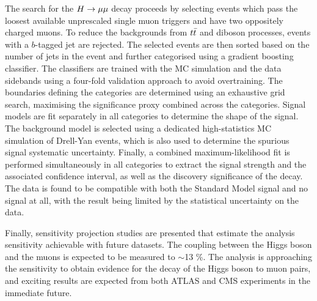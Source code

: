 The search for the $H \rightarrow \mu\mu$ decay proceeds by selecting
events which pass the loosest available unprescaled
single muon triggers and have two oppositely charged
muons. To reduce the backgrounds from $t\bar{t}$ and diboson
processes, events with a $b$-tagged jet are rejected.
The selected events are then sorted based on the number
of jets in the event and further categorised using a 
gradient boosting classifier. The classifiers are trained
with the MC simulation and the data sidebands using a four-fold
validation approach to avoid overtraining. The boundaries
defining the categories are determined using an exhaustive
grid search, maximising the significance proxy combined
across the categories. Signal models are fit separately
in all categories to determine the shape of the signal.
The background model is selected using a dedicated
high-statistics MC simulation of Drell-Yan events, which
is also used to determine the spurious signal systematic
uncertainty. Finally, a combined maximum-likelihood fit
is performed simultaneously in all categories to
extract the signal strength and the associated confidence
interval, as well as the discovery significance of the
decay. The data is found to be compatible with both the
Standard Model signal and no signal at all, with the
result being limited by the statistical uncertainty on
the data.

Finally, sensitivity projection studies are presented
that estimate the analysis sensitivity achievable
with future datasets. The coupling between the Higgs boson
and the muons is expected to be measured to $\sim$13 \%.
The analysis is approaching the
sensitivity to obtain evidence for the decay of the 
Higgs boson to muon pairs, and exciting results are
expected from both ATLAS and CMS experiments in the 
immediate future.






